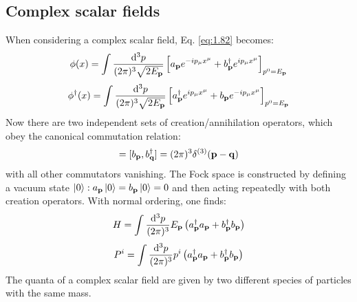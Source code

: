 \subsection{Complex scalar fields}

When considering a complex scalar field, Eq. \ref{eq:1.82} becomes:
\begin{equation}
  \phi(x) = \int \frac{\mathrm{d}^3p}{(2\pi)^3 \sqrt{2E_{\mathbf{p}}}} \left[ a_{\mathbf{p}} e^{-i p_\mu x^\mu} + b_{\mathbf{p}}^\dagger e^{i p_\mu x^\mu} \right]_{p^0 = E_{\mathbf{p}}}
  \label{eq:2.12}
\end{equation}
\begin{equation}
  \phi^\dagger(x) = \int \frac{\mathrm{d}^3p}{(2\pi)^3 \sqrt{2E_{\mathbf{p}}}} \left[ a_{\mathbf{p}}^\dagger e^{i p_\mu x^\mu} + b_{\mathbf{p}} e^{-i p_\mu x^\mu} \right]_{p^0 = E_{\mathbf{p}}}
  \label{eq:2.13}
\end{equation}
Now there are two independent sets of creation/annihilation operators, which obey the canonical commutation relation:
\begin{equation}
  [a_\ve{p} , a_\ve{q}^\dagger] = [b_\ve{p} , b_\ve{q}^\dagger] = (2\pi)^3 \delta^{(3)}(\ve{p} - \ve{q})
  \label{eq:2.14}
\end{equation}
with all other commutators vanishing. The Fock space is constructed by defining a vacuum state $ \ket{0} : a_{\mathbf{p}} \ket{0} = b_{\mathbf{p}} \ket{0} = 0 $ and then acting repeatedly with both creation operators. With normal ordering, one finds:
\begin{equation}
  H = \int \frac{\mathrm{d}^3p}{(2\pi)^3} E_{\mathbf{p}} \left( a_{\mathbf{p}}^\dagger a_{\mathbf{p}} + b_{\mathbf{p}}^\dagger b_{\mathbf{p}} \right)
  \label{eq:2.15}
\end{equation}
\begin{equation}
  P^i = \int \frac{\mathrm{d}^3p}{(2\pi)^3} p^i \left( a_{\mathbf{p}}^\dagger a_{\mathbf{p}} + b_{\mathbf{p}}^\dagger b_{\mathbf{p}} \right)
  \label{eq:2.16}
\end{equation}
The quanta of a complex scalar field are given by two different species of particles with the same mass.

